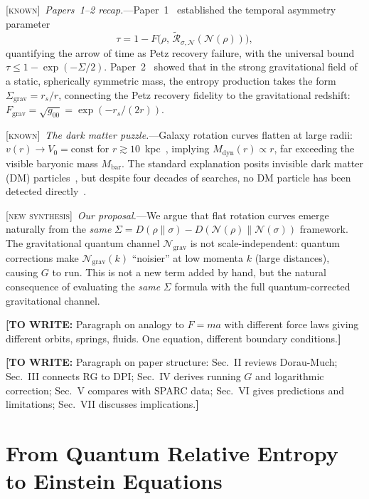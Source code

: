\documentclass[prl,twocolumn,superscriptaddress,longbibliography,floatfix]{revtex4-2}
\newcommand{\Petz}{\mathcal{R}}
\newcommand{\chan}{\mathcal{N}}
\newcommand{\tauasym}{\tau}
\newcommand{\known}{\textsc{[known]}}
\newcommand{\newsyn}{\textsc{[new synthesis]}}
\newcommand{\towrite}[1]{{\color{blue}\textbf{[TO WRITE:} #1\textbf{]}}}
\begin{document}
\known\ \emph{Papers~1--2 recap.}---Paper~1~\cite{Paper1}
established the temporal asymmetry parameter
\begin{equation}
\tauasym = 1 - F\!\big(\rho,\,
  \tilde{\Petz}_{\sigma,\chan}(\chan(\rho))\big),
\label{eq:tau_def}
\end{equation}
quantifying the arrow of time as Petz recovery failure, with the
universal bound $\tauasym \leq 1 - \exp(-\Sigma/2)$. Paper~2~\cite{Paper2}
showed that in the strong gravitational field of a static,
spherically symmetric mass, the entropy production takes the form
$\Sigma_{\mathrm{grav}} = r_s/r$, connecting the Petz recovery fidelity
to the gravitational redshift:
$F_{\mathrm{grav}} = \sqrt{g_{00}} = \exp(-r_s/(2r))$.

\known\ \emph{The dark matter puzzle.}---Galaxy rotation curves
flatten at large radii: $v(r) \to V_0 = \mathrm{const}$ for
$r \gtrsim 10$~kpc~\cite{Rubin1980,Bosma1981}, implying
$M_{\mathrm{dyn}}(r) \propto r$, far exceeding the visible baryonic
mass $M_{\mathrm{bar}}$. The standard explanation posits invisible
dark matter (DM) particles~\cite{Bertone2018}, but despite
four decades of searches, no DM particle has been detected
directly~\cite{Schumann2019,XENON2023}.

\newsyn\ \emph{Our proposal.}---We argue that flat rotation curves
emerge naturally from the \emph{same} $\Sigma = D(\rho\|\sigma) -
D(\chan(\rho)\|\chan(\sigma))$ framework. The gravitational quantum
channel $\chan_{\mathrm{grav}}$ is not scale-independent: quantum
corrections make $\chan_{\mathrm{grav}}(k)$ ``noisier'' at low
momenta $k$ (large distances), causing $G$ to run. This is not
a new term added by hand, but the natural consequence of evaluating
the \emph{same} $\Sigma$ formula with the full quantum-corrected
gravitational channel.

\towrite{Paragraph on analogy to $F = ma$ with different force laws
giving different orbits, springs, fluids. One equation, different
boundary conditions.}

\towrite{Paragraph on paper structure: Sec.~II reviews Dorau-Much;
Sec.~III connects RG to DPI; Sec.~IV derives running $G$ and
logarithmic correction; Sec.~V compares with SPARC data;
Sec.~VI gives predictions and limitations; Sec.~VII discusses
implications.}

\section{From Quantum Relative Entropy to Einstein Equations}
\label{sec:dorau_much}
\end{document}
